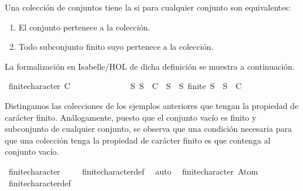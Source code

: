 \begin{isabellebody}
\begin{isamarkuptext}
\begin{definicion}
  Una colección de conjuntos tiene la  si para cualquier conjunto
  son equivalentes:
  \begin{enumerate}
    \item El conjunto pertenece a la colección.
    \item Todo subconjunto finito suyo pertenece a la colección.
  \end{enumerate}
\end{definicion}

  La formalización en Isabelle/HOL de dicha definición se muestra a continuación.%
\end{isamarkuptext}\isamarkuptrue%
\isamarkupfalse%
\ {\isachardoublequoteopen}finite{\isacharunderscore}character\ C\ {\isasymequiv}\ \isanewline
\ \ \ \ \ \ \ \ \ \ \ \ {\isacharparenleft}{\isasymforall}S{\isachardot}\ S\ {\isasymin}\ C\ {\isasymlongleftrightarrow}\ {\isacharparenleft}{\isasymforall}S{\isacharprime}\ {\isasymsubseteq}\ S{\isachardot}\ finite\ S{\isacharprime}\ {\isasymlongrightarrow}\ S{\isacharprime}\ {\isasymin}\ C{\isacharparenright}{\isacharparenright}{\isachardoublequoteclose}%
\begin{isamarkuptext}%
Distingamos las colecciones de los ejemplos anteriores que tengan la propiedad de carácter 
  finito. Análogamente, puesto que el conjunto vacío es finito y subconjunto de cualquier conjunto, 
  se observa que una condición necesaria para que una colección tenga la propiedad de carácter 
  finito es que contenga al conjunto vacío.%
\end{isamarkuptext}\isamarkuptrue%
\isamarkupfalse%
\ {\isachardoublequoteopen}finite{\isacharunderscore}character\ {\isacharbraceleft}{\isacharbraceleft}{\isacharbraceright}{\isacharbraceright}{\isachardoublequoteclose}\isanewline
%
\isadelimproof
\ \ %
\endisadelimproof
%
\isatagproof
{}\isamarkupfalse%
\ finite{\isacharunderscore}character{\isacharunderscore}def\ \isamarkupfalse%
\ auto%
\endisatagproof
{\isafoldproof}%
%
\isadelimproof
\isanewline
%
\endisadelimproof
\isanewline
{}\isamarkupfalse%
\ {\isachardoublequoteopen}{\isasymnot}\ finite{\isacharunderscore}character\ {\isacharbraceleft}{\isacharbraceleft}Atom\ {}{\isacharbraceright}{\isacharbraceright}{\isachardoublequoteclose}\isanewline
%
\isadelimproof
\ \ %
\endisadelimproof
%
\isatagproof
{}\isamarkupfalse%
\ finite{\isacharunderscore}character{\isacharunderscore}def\ \isamarkupfalse%

\end{isabellebody}
